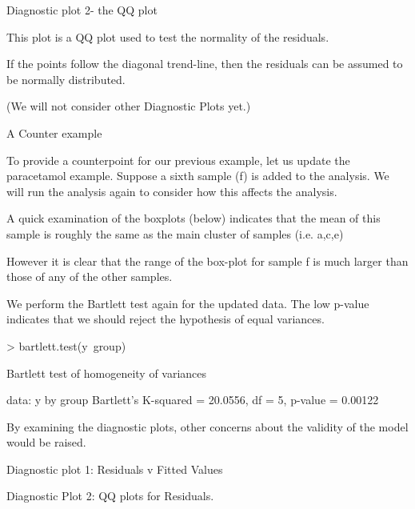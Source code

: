 Diagnostic plot 2- the QQ plot

This plot is a QQ plot used to test the normality of the residuals.

If the points follow the diagonal trend-line, then the residuals can be assumed to be normally distributed.

(We will not consider other Diagnostic Plots yet.)


A Counter example

To provide a counterpoint for our previous example, let us update the paracetamol example. Suppose a sixth sample (f) is added to the analysis. We will run the analysis again to consider how this affects the analysis.

A quick examination of the boxplots (below) indicates that the mean of this sample is roughly the same as the main cluster of samples (i.e. a,c,e)


However it is clear that the range of the box-plot for sample f is much larger than those of any of the other samples.




We perform the Bartlett test again for the updated data.
The low p-value indicates that we should reject the hypothesis of equal variances.

> bartlett.test(y~group)

        Bartlett test of homogeneity of variances

data:  y by group 
Bartlett's K-squared = 20.0556, df = 5, p-value = 0.00122

By examining the diagnostic plots, other concerns about the validity of the model would be raised.








Diagnostic plot 1: Residuals v Fitted Values

Diagnostic Plot 2: QQ plots for Residuals.

